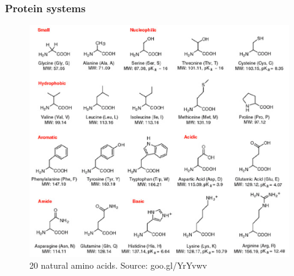 \documentclass{beamer}
\begin{document}
\begin{frame}\frametitle{Protein systems}

\begin{figure}
\includegraphics[scale=0.3]{aminoacids.eps}
\caption{{\scriptsize 20 natural amino acids. Source: goo.gl/YrYvwv}}
\end{figure}

\end{frame}
\end{document}
